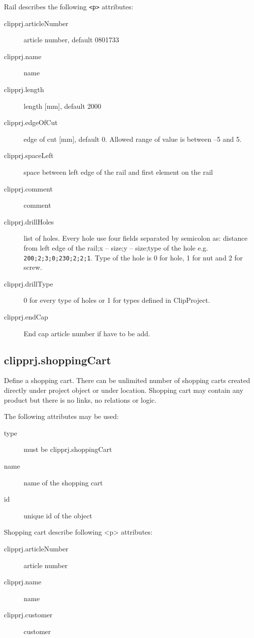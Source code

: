 \documentclass[%
	a4paper,
	oneside,
	listof=numbered,
	parskip=half,
	headsepline=true,
	footsepline=false,
	normalheadings,
	0.7headlines,
	headexclude,
	]{scrbook}
\begin{document}
Rail describes the following \verb|<p>| attributes: 

\begin{description}
	\item[clipprj.articleNumber] article number, default 0801733 
	\item[clipprj.name] name 
	\item[clipprj.length] length [mm], default 2000 
	\item[clipprj.edgeOfCut] edge of cut [mm], default 0.
	Allowed range of value is between –5 and 5.
	\item[clipprj.spaceLeft] space between left edge of the rail and first element on the rail 
	\item[clipprj.comment] comment 
	\item[clipprj.drillHoles] list of holes.
	Every hole use four fields separated by semicolon as: distance from left edge of the rail;x – size;y – size;type of the hole e.g. \verb|200;2;3;0;230;2;2;1|.
	Type of the hole is 0 for hole, 1 for nut and 2 for screw.
	\item[clipprj.drillType] 0 for every type of holes or 1 for types defined in ClipProject. 
	\item[clipprj.endCap] End cap article number if have to be add. 
\end{description}

\subsection{clipprj.shoppingCart} 

Define a shopping cart.
There can be unlimited number of shopping carts created directly under project object or under location.
Shopping cart may contain any product but there is no links, no relations or logic.

The following attributes may be used:

\begin{description}
	\item[type] must be clipprj.shoppingCart
	\item[name] name of the shopping cart
	\item[id] unique id of the object
\end{description}

Shopping cart describe following <p> attributes: 

\begin{description}
	\item[clipprj.articleNumber] article number 
	\item[clipprj.name] name 
	\item[clipprj.customer] customer 
\end{description}
 
\end{document}
